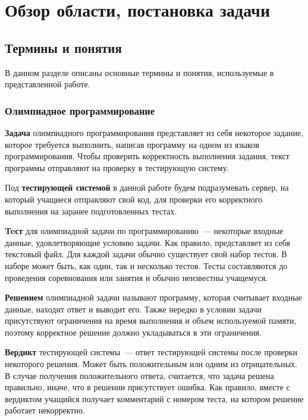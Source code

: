 \chapter{Обзор области, постановка задачи}

\section{Термины и понятия}

В данном разделе описаны основные термины и понятия, используемые в представленной работе.

\subsection{Олимпиадное программирование}


\textbf{Задача} олимпиадного программирования представляет из себя некоторое задание, которое требуется выполнить, написав
программу на одном из языков программирования. Чтобы проверить корректность выполнения задания, текст программы
отправляют на проверку в тестирующую систему.

Под \textbf{тестирующей системой} в данной работе будем подразумевать сервер, на который учащиеся отправляют свой код, 
для проверки его корректного выполнения на заранее подготовленных тестах.

\textbf{Teст} для олимпиадной задачи по программированию~--- некоторые входные данные, удовлетворяющие условию задачи.
Как правило, представляет из себя текстовый файл. Для каждой задачи обычно существует свой набор тестов. В наборе может быть,
как один, так и несколько тестов. Тесты составляются до проведения соревнования или занятия и обычно неизвестны учащемуся.

\textbf{Решением} олимпиадной задачи называют программу, которая считывает входные данные, находит ответ и выводит его.
Также нередко в условии задачи присутствуют ограничения на время выполнения и объем используемой памяти, поэтому
корректное решение должно укладываться в эти ограничения.

\textbf{Вердикт} тестирующей системы~--- ответ тестирующей системы после проверки некоторого решения. 
Может быть положительным или одним из отрицательных. 
В случае получения положительного ответа, считается, что задача решена правильно, иначе, что в решении присутствует ошибка.
Как правило, вместе с вердиктом учащийся получает комментарий с номером теста, на котором решение работает некорректно.

